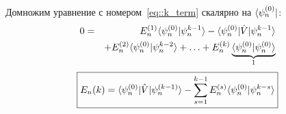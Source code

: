 \begin{itemize}
  Домножим уравнение с номером~\eqref{eq::k_term} скалярно на $\langle \psi_n^{(0)} |$:
  \begin{eqnarray*}
    0 &=& E_n^{(1)} \langle \psi_n^{(0)} | \psi_{n}^{k-1} \rangle - { \langle \psi_n^{(0)} |\hat V| \psi_n^{k-1} \rangle } \\
    &&+ E_n^{(2)} \langle \psi_n^{(0)} | \psi_n^{k-2} \rangle + \ldots + E_n^{(k)}\underbrace{ \langle \psi_n^{(0)} | \psi_n^{(0)} \rangle}_{1}
  \end{eqnarray*}
  $$
    \boxed{
        E_n(k) = { \langle \psi_n^{(0)} |\hat V| \psi_n^{(k-1)} \rangle } - \sum_{s=1}^{k-1} E_n^{(s)} \langle \psi_n^{(0)} | \psi_n^{k-s} \rangle
    }
  $$
\end{itemize}

